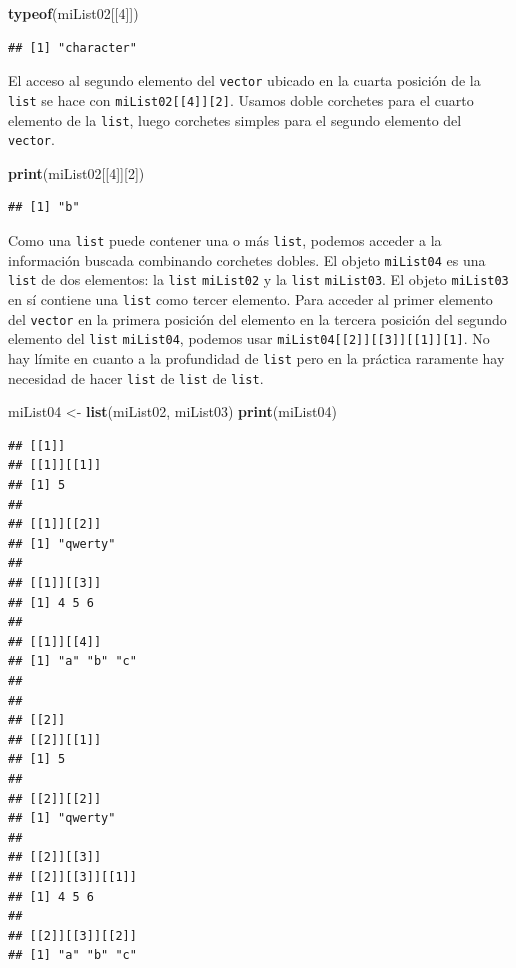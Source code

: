 \documentclass[]{book}
\newenvironment{Shaded}{\begin{snugshade}}{\end{snugshade}}
\newcommand{\KeywordTok}[1]{\textcolor[rgb]{0.13,0.29,0.53}{\textbf{#1}}}
\newcommand{\DecValTok}[1]{\textcolor[rgb]{0.00,0.00,0.81}{#1}}
\newcommand{\StringTok}[1]{\textcolor[rgb]{0.31,0.60,0.02}{#1}}
\newcommand{\NormalTok}[1]{#1}
\begin{document}
\begin{Shaded}
\begin{Highlighting}[]
\KeywordTok{typeof}\NormalTok{(miList02[[}\DecValTok{4}\NormalTok{]])}
\end{Highlighting}
\end{Shaded}

\begin{verbatim}
## [1] "character"
\end{verbatim}

El acceso al segundo elemento del \texttt{vector} ubicado en la cuarta
posición de la \texttt{list} se hace con
\texttt{miList02{[}{[}4{]}{]}{[}2{]}}. Usamos doble corchetes para el
cuarto elemento de la \texttt{list}, luego corchetes simples para el
segundo elemento del \texttt{vector}.

\begin{Shaded}
\begin{Highlighting}[]
\KeywordTok{print}\NormalTok{(miList02[[}\DecValTok{4}\NormalTok{]][}\DecValTok{2}\NormalTok{])}
\end{Highlighting}
\end{Shaded}

\begin{verbatim}
## [1] "b"
\end{verbatim}

Como una \texttt{list} puede contener una o más \texttt{list}, podemos
acceder a la información buscada combinando corchetes dobles. El objeto
\texttt{miList04} es una \texttt{list} de dos elementos: la
\texttt{list} \texttt{miList02} y la \texttt{list} \texttt{miList03}. El
objeto \texttt{miList03} en sí contiene una \texttt{list} como tercer
elemento. Para acceder al primer elemento del \texttt{vector} en la
primera posición del elemento en la tercera posición del segundo
elemento del \texttt{list} \texttt{miList04}, podemos usar
\texttt{miList04{[}{[}2{]}{]}{[}{[}3{]}{]}{[}{[}1{]}{]}{[}1{]}}. No hay
límite en cuanto a la profundidad de \texttt{list} pero en la práctica
raramente hay necesidad de hacer \texttt{list} de \texttt{list} de
\texttt{list}.

\begin{Shaded}
\begin{Highlighting}[]
\NormalTok{miList04 <-}\StringTok{ }\KeywordTok{list}\NormalTok{(miList02, miList03)}
\KeywordTok{print}\NormalTok{(miList04)}
\end{Highlighting}
\end{Shaded}

\begin{verbatim}
## [[1]]
## [[1]][[1]]
## [1] 5
## 
## [[1]][[2]]
## [1] "qwerty"
## 
## [[1]][[3]]
## [1] 4 5 6
## 
## [[1]][[4]]
## [1] "a" "b" "c"
## 
## 
## [[2]]
## [[2]][[1]]
## [1] 5
## 
## [[2]][[2]]
## [1] "qwerty"
## 
## [[2]][[3]]
## [[2]][[3]][[1]]
## [1] 4 5 6
## 
## [[2]][[3]][[2]]
## [1] "a" "b" "c"
\end{verbatim}
\end{document}
